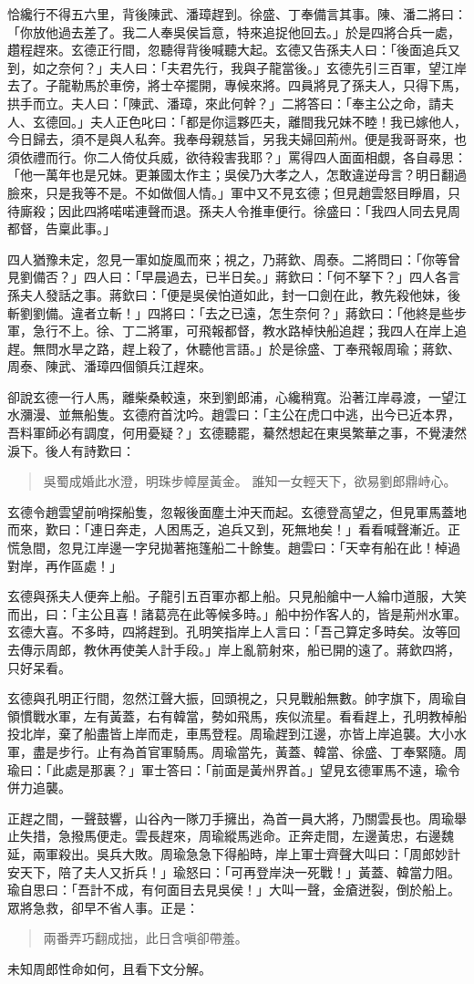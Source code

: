 恰纔行不得五六里，背後陳武、潘璋趕到。徐盛、丁奉備言其事。陳、潘二將曰：「你放他過去差了。我二人奉吳侯旨意，特來追捉他回去。」於是四將合兵一處，趲程趕來。玄德正行間，忽聽得背後喊聽大起。玄德又告孫夫人曰：「後面追兵又到，如之奈何？」夫人曰：「夫君先行，我與子龍當後。」玄德先引三百軍，望江岸去了。子龍勒馬於車傍，將士卒擺開，專候來將。四員將見了孫夫人，只得下馬，拱手而立。夫人曰：「陳武、潘璋，來此何幹？」二將答曰：「奉主公之命，請夫人、玄德回。」夫人正色叱曰：「都是你這夥匹夫，離間我兄妹不睦！我已嫁他人，今日歸去，須不是與人私奔。我奉母親慈旨，另我夫婦回荊州。便是我哥哥來，也須依禮而行。你二人倚仗兵威，欲待殺害我耶？」罵得四人面面相覷，各自尋思：「他一萬年也是兄妹。更兼國太作主；吳侯乃大孝之人，怎敢違逆母言？明日翻過臉來，只是我等不是。不如做個人情。」軍中又不見玄德；但見趙雲怒目睜眉，只待廝殺；因此四將喏喏連聲而退。孫夫人令推車便行。徐盛曰：「我四人同去見周都督，告稟此事。」

四人猶豫未定，忽見一軍如旋風而來；視之，乃蔣欽、周泰。二將問曰：「你等曾見劉備否？」四人曰：「早晨過去，已半日矣。」蔣欽曰：「何不拏下？」四人各言孫夫人發話之事。蔣欽曰：「便是吳侯怕道如此，封一口劍在此，教先殺他妹，後斬劉劉備。違者立斬！」四將曰：「去之已遠，怎生奈何？」蔣欽曰：「他終是些步軍，急行不上。徐、丁二將軍，可飛報都督，教水路棹快船追趕；我四人在岸上追趕。無問水旱之路，趕上殺了，休聽他言語。」於是徐盛、丁奉飛報周瑜；蔣欽、周泰、陳武、潘璋四個領兵江趕來。

卻說玄德一行人馬，離柴桑較遠，來到劉郎浦，心纔稍寬。沿著江岸尋渡，一望江水瀰漫、並無船隻。玄德府首沈吟。趙雲曰：「主公在虎口中逃，出今已近本界，吾料軍師必有調度，何用憂疑？」玄德聽罷，驀然想起在東吳繁華之事，不覺淒然淚下。後人有詩歎曰：

\begin{quote}
吳蜀成婚此水澄，明珠步幛屋黃金。
誰知一女輕天下，欲易劉郎鼎峙心。
\end{quote}

玄德令趙雲望前哨探船隻，忽報後面塵土沖天而起。玄德登高望之，但見軍馬蓋地而來，歎曰：「連日奔走，人困馬乏，追兵又到，死無地矣！」看看喊聲漸近。正慌急間，忽見江岸邊一字兒拋著拖篷船二十餘隻。趙雲曰：「天幸有船在此！棹過對岸，再作區處！」

玄德與孫夫人便奔上船。子龍引五百軍亦都上船。只見船艙中一人綸巾道服，大笑而出，曰：「主公且喜！諸葛亮在此等候多時。」船中扮作客人的，皆是荊州水軍。玄德大喜。不多時，四將趕到。孔明笑指岸上人言曰：「吾己算定多時矣。汝等回去傳示周郎，教休再使美人計手段。」岸上亂箭射來，船已開的遠了。蔣欽四將，只好呆看。

玄德與孔明正行間，忽然江聲大振，回頭視之，只見戰船無數。帥字旗下，周瑜自領慣戰水軍，左有黃蓋，右有韓當，勢如飛馬，疾似流星。看看趕上，孔明教棹船投北岸，棄了船盡皆上岸而走，車馬登程。周瑜趕到江邊，亦皆上岸追襲。大小水軍，盡是步行。止有為首官軍騎馬。周瑜當先，黃蓋、韓當、徐盛、丁奉緊隨。周瑜曰：「此處是那裏？」軍士答曰：「前面是黃州界首。」望見玄德軍馬不遠，瑜令併力追襲。

正趕之間，一聲鼓響，山谷內一隊刀手擁出，為首一員大將，乃關雲長也。周瑜舉止失措，急撥馬便走。雲長趕來，周瑜縱馬逃命。正奔走間，左邊黃忠，右邊魏延，兩軍殺出。吳兵大敗。周瑜急急下得船時，岸上軍士齊聲大叫曰：「周郎妙計安天下，陪了夫人又折兵！」瑜怒曰：「可再登岸決一死戰！」黃蓋、韓當力阻。瑜自思曰：「吾計不成，有何面目去見吳侯！」大叫一聲，金瘡迸裂，倒於船上。眾將急救，卻早不省人事。正是：

\begin{quote}
兩番弄巧翻成拙，此日含嗔卻帶羞。
\end{quote}

未知周郎性命如何，且看下文分解。
